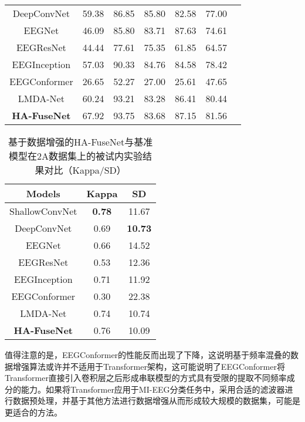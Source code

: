 \begin{table}[ht]
\begin{subtable}[ht]{\textwidth}
\begin{tabularx}{\textwidth}{CCCCCCC}
        DeepConvNet\cite{schirrmeister2017deep}  & 59.38 & 86.85 & 85.80 & 82.58 & 77.00 \\
        EEGNet\cite{lawhern2018eegnet} & 46.09 & 85.80 & 83.71 & 87.63 & 74.61 \\
        EEGResNet\cite{HBM:HBM23730}  & 44.44 & 77.61 & 75.35 & 61.85 & 64.57 \\
        EEGInception\cite{zhang2021eeg} & 57.03 & 90.33 & 84.76 & 84.58 & 78.42 \\
        EEGConformer\cite{song2022eeg}  & 26.65 & 52.27 & 27.00 & 25.61 & 47.65 \\
        LMDA-Net\cite{miao2023lmda}& 60.24 & 93.21 & 83.28 & 86.41 & 80.44 \\
        \midrule 
        \textbf{HA-FuseNet} & 67.92 & 93.75 & 83.68 & 87.15 & 81.56 \\
        \bottomrule
      \end{tabularx}
    \end{subtable}
\end{table}
\begin{table}[H]
    \centering
    \caption{基于数据增强的HA-FuseNet与基准模型在2A数据集上的被试内实验结果对比（Kappa/SD）}
    \label{tab:2acompareagsd}
    \begin{tabularx}{\textwidth}{CCC}
      \toprule
      Models & Kappa & SD \\
      \midrule
      ShallowConvNet\cite{schirrmeister2017deep} & \textbf{0.78} & 11.67 \\
      DeepConvNet\cite{schirrmeister2017deep} & 0.69 & \textbf{10.73} \\
      EEGNet\cite{lawhern2018eegnet} & 0.66 & 14.52 \\
      EEGResNet\cite{HBM:HBM23730} & 0.53 & 12.36 \\
      EEGInception\cite{zhang2021eeg} & 0.71 & 11.92 \\
      EEGConformer\cite{song2022eeg} & 0.30 & 22.38 \\
      LMDA-Net\cite{miao2023lmda} & 0.74 & 10.74 \\
      \midrule 
      \textbf{HA-FuseNet} & 0.76 & 10.09 \\
      \bottomrule
    \end{tabularx}
\end{table}

值得注意的是，EEGConformer的性能反而出现了下降，这说明基于频率混叠的数据增强算法或许并不适用于Transformer架构，这可能说明了EEGConformer将Transformer直接引入卷积层之后形成串联模型的方式具有受限的提取不同频率成分的能力。如果将Transformer应用于MI-EEG分类任务中，采用合适的滤波器进行数据预处理，并基于其他方法进行数据增强从而形成较大规模的数据集，可能是更适合的方法。

